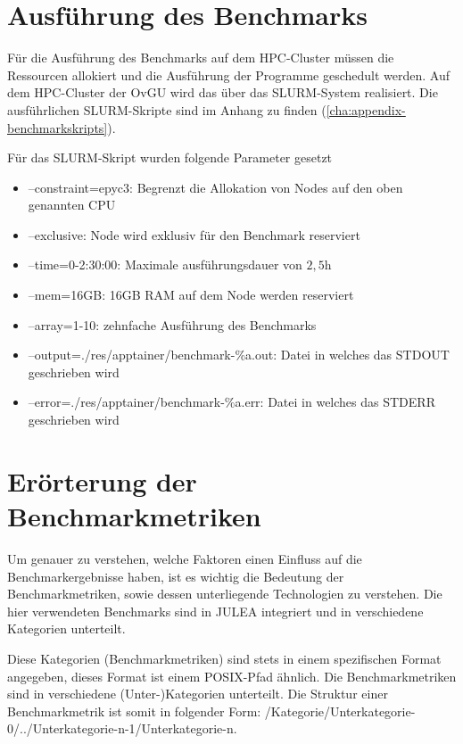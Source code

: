 \section{Ausführung des Benchmarks} \label{sec:benchmark-execution}

Für die Ausführung des Benchmarks auf dem HPC-Cluster müssen die Ressourcen allokiert und die Ausführung der Programme geschedult werden. Auf dem HPC-Cluster der OvGU wird das über das SLURM-System realisiert. Die ausführlichen SLURM-Skripte sind im Anhang zu finden (\cref{cha:appendix-benchmarkskripts}).

Für das SLURM-Skript wurden folgende Parameter gesetzt

\begin{itemize}
    \item --constraint=epyc3: Begrenzt die Allokation von Nodes auf den oben genannten CPU
    \item --exclusive: Node wird exklusiv für den Benchmark reserviert
    \item --time=0-2:30:00: Maximale ausführungsdauer von $2,5\text{h}$
    \item --mem=16GB: 16GB RAM auf dem Node werden reserviert
    \item --array=1-10: zehnfache Ausführung des Benchmarks
    \item --output=./res/apptainer/benchmark-\%a.out: Datei in welches das STDOUT geschrieben wird
    \item --error=./res/apptainer/benchmark-\%a.err: Datei in welches das STDERR geschrieben wird 
\end{itemize}

\section{Erörterung der Benchmarkmetriken}

Um genauer zu verstehen, welche Faktoren einen Einfluss auf die Benchmarkergebnisse haben, ist es wichtig die Bedeutung der Benchmarkmetriken, sowie dessen unterliegende Technologien zu verstehen. 
Die hier verwendeten Benchmarks sind in JULEA integriert und in verschiedene Kategorien unterteilt.

Diese Kategorien (Benchmarkmetriken) sind stets in einem spezifischen Format angegeben, dieses Format ist einem POSIX-Pfad ähnlich. Die Benchmarkmetriken sind in verschiedene (Unter-)Kategorien unterteilt. Die Struktur einer Benchmarkmetrik ist somit in folgender Form: /Kategorie/Unterkategorie-0/../Unterkategorie-n-1/Unterkategorie-n.

